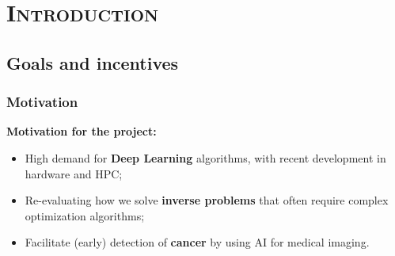 

\section{\textsc{Introduction}}


\subsection{Goals and incentives}


\begin{frame}
    \frametitle{Motivation }
  
    \begin{alertblock}{\textbf{Motivation for the project:}}      
      \begin{itemize}
        \item High demand for \textbf{Deep Learning} algorithms, with recent development in hardware and HPC; %
        \item Re-evaluating how we solve \textbf{inverse problems} that often require complex optimization algorithms; %
        \item Facilitate (early) detection of \textbf{cancer} by using AI for medical imaging. %
      \end{itemize}
    \end{alertblock}



\end{frame}
